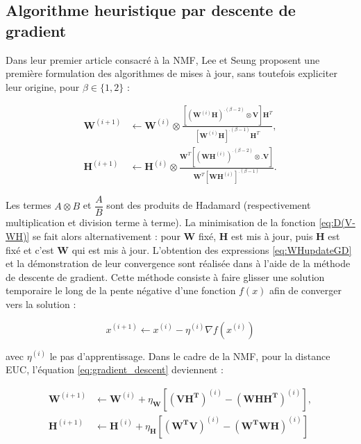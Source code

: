 \subsection{Algorithme heuristique par descente de gradient}

Dans leur premier article consacré à la NMF, Lee et Seung \cite{lee_learning_1999} proposent une première formulation des algorithmes de mises à jour, sans toutefois expliciter leur origine,  pour $\beta  \in \lbrace 1,2 \rbrace$ :

\begin{subequations}\label{eq:WHupdateGD}
\begin{align}
\textbf{W}^{(i+1)} &\leftarrow \textbf{W}^{(i)}\otimes\frac{\left[\left(\textbf{W}^{(i)}\mathbf{H} \right)^{.(\beta-2)}\otimes\textbf{V} \right]\textbf{H}^T}{\left[\textbf{W}^{(i)}\mathbf{H} \right]^{.(\beta-1)}\textbf{H}^T},\\
\textbf{H}^{(i+1)} &\leftarrow \textbf{H}^{(i)}\otimes\frac{\textbf{W}^T \left[\left(\textbf{WH}^{(i)} \right)^{.(\beta-2)}\otimes.\textbf{V} \right]}{\textbf{W}^T \left[\textbf{WH}^{(i)} \right]^{.(\beta-1)}}.
\end{align}
\end{subequations}

Les termes $A\otimes B$ et $\dfrac{A}{B}$ sont des produits de Hadamard (respectivement multiplication et division terme à terme). La minimisation de la fonction \ref{eq:D(V-WH)} se fait alors alternativement : pour $\mathbf{W}$ fixé, $\mathbf{H}$ est mis à jour, puis $\mathbf{H}$ est fixé et c'est $\mathbf{W}$ qui est mis à jour.
L'obtention des expressions \ref{eq:WHupdateGD} et la démonstration de leur convergence sont réalisée dans \cite{lee_algorithms_2000} à l'aide de la méthode de descente de gradient. Cette méthode consiste à faire \og glisser \fg {} une solution temporaire le long de la pente négative d'une fonction $f(x)$ afin de converger vers la solution \cite{kivinen_exponentiated_1994} :

\begin{equation}\label{eq:gradient_descent}
x^{(i+1)} \leftarrow x^{(i)} - \eta^{(i)} \nabla f(x^{(i)})
\end{equation}

avec $\eta^{(i)}$ le pas d'apprentissage. Dans le cadre de la NMF, pour la distance EUC, l'équation \ref{eq:gradient_descent} deviennent :

\begin{subequations}\label{eq:WHgradientDescente}
    \begin{align}
     \mathbf{W}^{(i+1)} & \leftarrow \mathbf{W}^{(i)}+\eta_{\mathbf{W}}\left[ \left(\mathbf{V H^T}\right)^{(i)} - \left(\mathbf{W H H^T}\right)^{(i)} \right ], \\
      \mathbf{H}^{(i+1)} & \leftarrow \mathbf{H}^{(i)}+\eta_{\mathbf{H}}\left[ \left(\mathbf{W^TV}\right)^{(i)}-\left(\mathbf{W^T W H} \right)^{(i)}\right ]
    \end{align}
\end{subequations}

